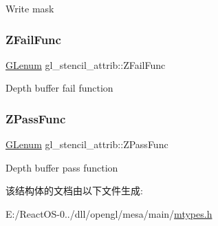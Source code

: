 Write mask \mbox{\label{structgl__stencil__attrib_aeca1304daecf78e3bc73266b90213ace}} 
\subsubsection{\texorpdfstring{Z\+Fail\+Func}{ZFailFunc}}
{\footnotesize\ttfamily \hyperlink{interfacevoid}{G\+Lenum} gl\+\_\+stencil\+\_\+attrib\+::\+Z\+Fail\+Func}

Depth buffer fail function \mbox{\label{structgl__stencil__attrib_a8e61ca23b8efe111008199eb37bb39b4}} 
\subsubsection{\texorpdfstring{Z\+Pass\+Func}{ZPassFunc}}
{\footnotesize\ttfamily \hyperlink{interfacevoid}{G\+Lenum} gl\+\_\+stencil\+\_\+attrib\+::\+Z\+Pass\+Func}

Depth buffer pass function 

该结构体的文档由以下文件生成\+:\begin{DoxyCompactItemize}
\item 
E\+:/\+React\+O\+S-\/0../dll/opengl/mesa/main/\hyperlink{mtypes_8h}{mtypes.\+h}\end{DoxyCompactItemize}
